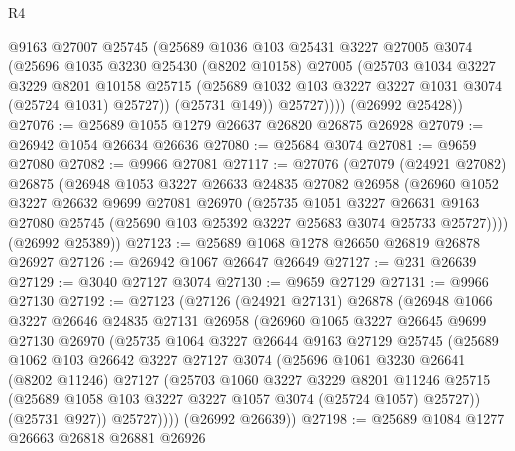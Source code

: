 \begin{lexlean}{R4}
\begin{coremodule}
            @9163
            @27007
            @25745
            (@25689
              @1036
              @103
              @25431
              @3227
              @27005
              @3074
              (@25696
                @1035
                @3230
                @25430
                (@8202 @10158)
                @27005
                (@25703
                  @1034
                  @3227
                  @3229
                  @8201
                  @10158
                  @25715
                  (@25689 @1032 @103 @3227 @3227 @1031 @3074 (@25724 @1031) @25727))
                (@25731 @149))
              @25727))))
      (@26992 @25428))
@27076 := @25689 @1055 @1279 @26637 @26820 @26875 @26928
@27079 := @26942 @1054 @26634 @26636
@27080 := @25684 @3074
@27081 := @9659 @27080
@27082 := @9966 @27081
@27117 := @27076
    (@27079
      (@24921 @27082)
      @26875
      (@26948
        @1053
        @3227
        @26633
        @24835
        @27082
        @26958
        (@26960
          @1052
          @3227
          @26632
          @9699
          @27081
          @26970
          (@25735
            @1051
            @3227
            @26631
            @9163
            @27080
            @25745
            (@25690 @103 @25392 @3227 @25683 @3074 @25733 @25727))))
      (@26992 @25389))
@27123 := @25689 @1068 @1278 @26650 @26819 @26878 @26927
@27126 := @26942 @1067 @26647 @26649
@27127 := @231 @26639
@27129 := @3040 @27127 @3074
@27130 := @9659 @27129
@27131 := @9966 @27130
@27192 := @27123
    (@27126
      (@24921 @27131)
      @26878
      (@26948
        @1066
        @3227
        @26646
        @24835
        @27131
        @26958
        (@26960
          @1065
          @3227
          @26645
          @9699
          @27130
          @26970
          (@25735
            @1064
            @3227
            @26644
            @9163
            @27129
            @25745
            (@25689
              @1062
              @103
              @26642
              @3227
              @27127
              @3074
              (@25696
                @1061
                @3230
                @26641
                (@8202 @11246)
                @27127
                (@25703
                  @1060
                  @3227
                  @3229
                  @8201
                  @11246
                  @25715
                  (@25689 @1058 @103 @3227 @3227 @1057 @3074 (@25724 @1057) @25727))
                (@25731 @927))
              @25727))))
      (@26992 @26639))
@27198 := @25689 @1084 @1277 @26663 @26818 @26881 @26926

\end{coremodule}
\end{lexlean}
